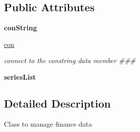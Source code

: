 \subsection*{\-Public \-Attributes}
\begin{DoxyCompactItemize}
\item 
\hypertarget{classDataDownLoader_1_1DataDownloader_1_1DataDownloader_a5c0cef4f4e53bdc090c7e737e31cb503}{{\bfseries con\-String}}\label{classDataDownLoader_1_1DataDownloader_1_1DataDownloader_a5c0cef4f4e53bdc090c7e737e31cb503}

\item 
\hypertarget{classDataDownLoader_1_1DataDownloader_1_1DataDownloader_a799adde768f80d566e56423b2952ce45}{\hyperlink{classDataDownLoader_1_1DataDownloader_1_1DataDownloader_a799adde768f80d566e56423b2952ce45}{con}}\label{classDataDownLoader_1_1DataDownloader_1_1DataDownloader_a799adde768f80d566e56423b2952ce45}

\begin{DoxyCompactList}\small\item\em connect to the constring data member \#\#\# \end{DoxyCompactList}\item 
\hypertarget{classDataDownLoader_1_1DataDownloader_1_1DataDownloader_ab4c07fc12f094e3c4ad36bf74e772218}{{\bfseries series\-List}}\label{classDataDownLoader_1_1DataDownloader_1_1DataDownloader_ab4c07fc12f094e3c4ad36bf74e772218}

\end{DoxyCompactItemize}


\subsection{\-Detailed \-Description}
\begin{DoxyVerb}
Class to manage finance data
\end{DoxyVerb}
 

